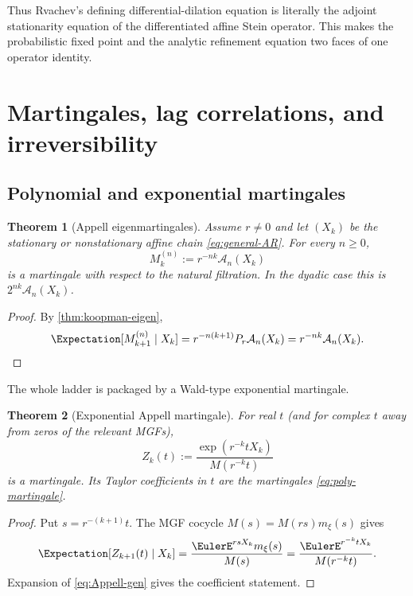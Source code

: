 \documentclass[11pt,a4paper]{article}
\newtheorem{theorem}{Theorem}[section]
\theoremstyle{definition}
\theoremstyle{remark}
\newcommand{\Acal}{\mathcal A}
\begin{document}
Thus Rvachev's defining differential-dilation equation is literally the adjoint stationarity equation of the differentiated affine Stein operator. This makes the probabilistic fixed point and the analytic refinement equation two faces of one operator identity.

\section{Martingales, lag correlations, and irreversibility}
\label{sec:martingales}

\subsection{Polynomial and exponential martingales}

\begin{theorem}[Appell eigenmartingales]
\label{thm:Appell-martingales}
Assume $r\ne0$ and let $(X_k)$ be the stationary or nonstationary affine chain \eqref{eq:general-AR}. For every $n\ge0$,
\begin{equation}
 M_k^{(n)}:=r^{-nk}\Acal_n(X_k)
 \label{eq:poly-martingale}
\end{equation}
is a martingale with respect to the natural filtration. In the dyadic case this is $2^{nk}\Acal_n(X_k)$.
\end{theorem}

\begin{proof}
By \cref{thm:koopman-eigen},
\[
 \Expectation[M_{k+1}^{(n)}\mid X_k]
 =r^{-n(k+1)}P_r\Acal_n(X_k)
 =r^{-nk}\Acal_n(X_k).
\]
\end{proof}

The whole ladder is packaged by a Wald-type exponential martingale.

\begin{theorem}[Exponential Appell martingale]
\label{thm:exponential-martingale}
For real $t$ (and for complex $t$ away from zeros of the relevant MGFs),
\begin{equation}
 Z_k(t):=\frac{\exp(r^{-k}tX_k)}{M(r^{-k}t)}
 \label{eq:exp-martingale}
\end{equation}
is a martingale. Its Taylor coefficients in $t$ are the martingales \eqref{eq:poly-martingale}.
\end{theorem}

\begin{proof}
Put $s=r^{-(k+1)}t$. The MGF cocycle $M(s)=M(rs)m_\xi(s)$ gives
\[
 \Expectation[Z_{k+1}(t)\mid X_k]
 =\frac{\EulerE^{rsX_k}m_\xi(s)}{M(s)}
 =\frac{\EulerE^{r^{-k}tX_k}}{M(r^{-k}t)}.
\]
Expansion of \eqref{eq:Appell-gen} gives the coefficient statement.
\end{proof}
\end{document}
